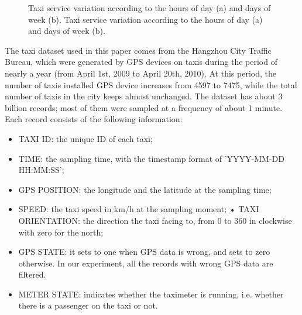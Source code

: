 \documentclass[a4paper, 10pt, conference]{ieeeconf}      %
\begin{document}
\begin{figure}[ht]
    \centering
    \caption{ Taxi service variation according to the hours of day (a) and days of week (b). Taxi service variation according to the hours of day (a) and days of week (b).}
    \label{fig:my_png_2}
\end{figure}

The taxi dataset used in this paper comes from the Hangzhou City Traffic Bureau, which were generated by GPS devices on taxis during the period of nearly a year (from April 1st, 2009 to April 20th, 2010). At this period, the number of taxis installed GPS device increases from 4597 to 7475, while the total number of taxis in the city keeps almost unchanged. The dataset has about 3 billion records; most of them were sampled at a frequency of about 1 minute. Each record consists of the following information:

\begin{itemize}

\item TAXI ID: the unique ID of each taxi;
\item TIME: the sampling time, with the timestamp format of ’YYYY-MM-DD HH:MM:SS’;
\item GPS POSITION: the longitude and the latitude at the sampling time;
\item SPEED: the taxi speed in km/h at the sampling moment; • TAXI ORIENTATION: the direction the taxi facing to, from 0 to 360 in clockwise with zero for the north;
\item GPS STATE: it sets to one when GPS data is wrong, and sets to zero otherwise. In our experiment, all the records with wrong GPS data are filtered.
\item METER STATE: indicates whether the taximeter is running, i.e. whether there is a passenger on the taxi or not.

\end{itemize}
\end{document}
